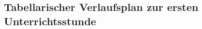 \documentclass[12pt]{article}
\begin{document}
\newpage
\printbibliography[heading=bibintoc]
\pagestyle{empty}

\newpage
\begin{appendices}

    \section{Tabellarischer Verlaufsplan zur ersten Unterrichtsstunde}
    \begin{center}
    \end{center}

\end{appendices}
\end{document}
